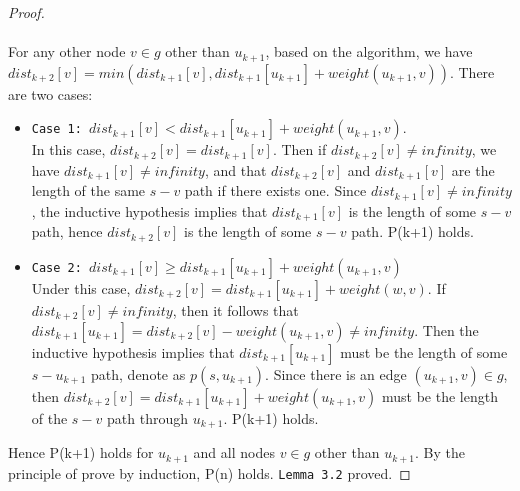 \documentclass[11pt, oneside]{article}   	%
\newcommand\tab[1][1cm]{\hspace*{#1}}
\theoremstyle{definition}
\begin{document}
\begin{proof}
\\\\
For any other node $v \in g$ other than $u_{k+1}$, based on the algorithm, we have $dist_{k+2}[v] = min(dist_{k+1}[v], dist_{k+1}[u_{k+1}] + weight(u_{k+1}, v))$. There are two cases:
\begin{itemize}
  \item \texttt{Case 1: $dist_{k+1}[v] < dist_{k+1}[u_{k+1}] + weight(u_{k+1}, v)$}. \\
  In this case, $dist_{k+2}[v] = dist_{k+1}[v]$. Then if $dist_{k+2}[v] \neq infinity$, we have $dist_{k+1}[v] \neq infinity$, and that $dist_{k+2}[v]$ and $dist_{k+1}[v]$ are the length of the same $s-v$ path if there exists one. Since $dist_{k+1}[v] \neq infinity$, the inductive hypothesis implies that $dist_{k+1}[v]$ is the length of some $s-v$ path, hence $dist_{k+2}[v]$ is the length of some $s-v$ path. P(k+1) holds. 

  \item \texttt{Case 2: $dist_{k+1}[v] \geq dist_{k+1}[u_{k+1}] + weight(u_{k+1}, v)$}\\
  Under this case, $dist_{k+2}[v] = dist_{k+1}[u_{k+1}] + weight(w, v)$. If $dist_{k+2}[v] \neq infinity$, then it follows that $dist_{k+1}[u_{k+1}] = dist_{k+2}[v] - weight(u_{k+1}, v) \neq infinity$. Then the inductive hypothesis implies that $dist_{k+1}[u_{k+1}]$ must be the length of some $s-u_{k+1}$ path, denote as $p(s, u_{k+1})$. Since there is an edge $(u_{k+1}, v) \in g$, then $dist_{k+2}[v] = dist_{k+1}[u_{k+1}] + weight(u_{k+1}, v)$ must be the length of the $s-v$ path through $u_{k+1}$. P(k+1) holds. 
\end{itemize}
Hence P(k+1) holds for $u_{k+1}$ and all nodes $v \in g$ other than $u_{k+1}$. By the principle of prove by induction, P(n) holds. \texttt{\texttt{Lemma 3.2}} proved. 
\end{proof}
\tab\\ 
\end{document}
